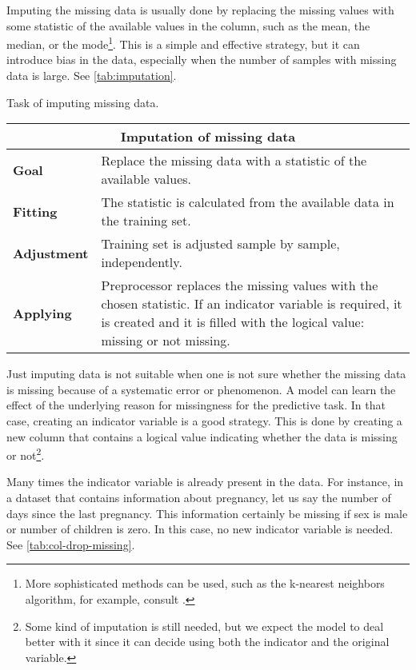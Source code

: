Imputing the missing data is usually done by replacing the missing values with some
statistic of the available values in the column, such as the mean, the median, or the
mode\footnote{More sophisticated methods can be used, such as the k-nearest neighbors
algorithm, for example, consult .}.  This is a simple and
effective strategy, but it can introduce bias in the data, especially when the number of
samples with missing data is large.  See \cref{tab:imputation}.

\begin{tablebox}[label=tab:imputation]{Task of imputing missing data.}
  \centering
  \begin{tabular}{lp{6cm}}
    \toprule
    \multicolumn{2}{c}{\textbf{Imputation of missing data}} \\
    \midrule
    \textbf{Goal} &
      Replace the missing data with a statistic of the available values. \\
    \textbf{Fitting} &
      The statistic is calculated from the available data in the training set. \\
    \textbf{Adjustment} &
      Training set is adjusted sample by sample, independently. \\
    \textbf{Applying} &
      Preprocessor replaces the missing values with the chosen statistic. If an indicator
      variable is required, it is created and it is filled with the logical value:
      missing or not missing. \\
    \bottomrule
  \end{tabular}
\end{tablebox}

Just imputing data is not suitable when one is not sure whether the missing data is
missing because of a systematic error or phenomenon.  A model can learn the effect of the
underlying reason for missingness for the predictive task.
In that case, creating an indicator variable is a good strategy.  This is done by creating
a new column that contains a logical value indicating whether the data is missing or
not\footnote{Some kind of imputation is still needed, but we expect the model to deal
better with it since it can decide using both the indicator and the original variable.}.

Many times the indicator variable is already present in the data.  For instance, in a
dataset that contains information about pregnancy, let us say the number of days since
the last pregnancy.  This information certainly be missing if sex is male
or number of children is zero.  In this case, no new indicator variable is needed.
See \cref{tab:col-drop-missing}.

